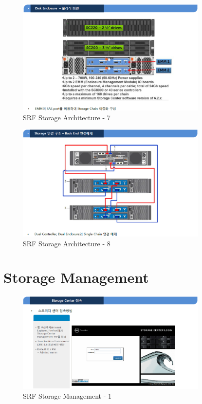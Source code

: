 \documentclass[11pt
  , a4paper
  , article
  , oneside
]{memoir}
\begin{document}
\begin{figure}[h!]
	\centering
	\includegraphics[width=0.85\textwidth]{./images/srfdb_storage_arch_7.eps}
	\caption{SRF Storage Architecture - 7}
	\label{fig:srfdb_arch_7} 
\end{figure}

\begin{figure}[h!]
	\centering
	\includegraphics[width=0.85\textwidth]{./images/srfdb_storage_arch_8.eps}
	\caption{SRF Storage Architecture - 8}
	\label{fig:srfdb_arch_8} 
\end{figure}

\clearpage

\section{Storage Management}
\begin{figure}[h!]
	\centering
	\includegraphics[width=0.85\textwidth]{./images/srfdb_storage_mana_1.eps}
	\caption{SRF Storage Management - 1}
	\label{fig:srfdb_mana_1} 
\end{figure}
\end{document}
